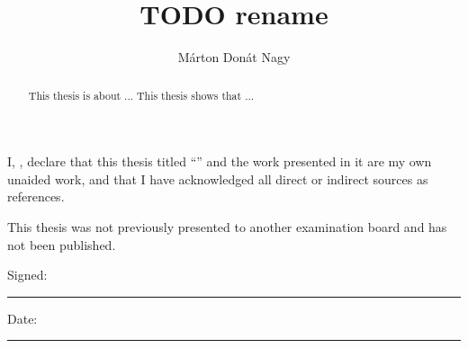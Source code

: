 \documentclass[%
    ]{\PathToTumTemplate/thesis/tum_thesis}
\title{TODO rename}                          %
\author{Márton Donát Nagy}                         %
\begin{document}
\frontmatter

\maketitle

\newcommand{\thecolophon}{  
    \begin{colophon}
        \vspace*{1cm}     
        \begin{minipage}{0.5\textwidth}\begin{flushleft}
        This thesis was typeset using the XeTeX{} 
        typesetting system developed by Jonathan Kew. 
        \end{flushleft}
        \end{minipage}
    \end{colophon}
}


\begin{authordecl}
    \noindent I, \theauthor, declare that this thesis titled
    ``\thetitle'' and the work presented in it are my own unaided
    work, and that I have acknowledged all direct or indirect sources as
    references.

    This thesis was not previously presented to another examination board
    and has not been published.

    \vspace{2em}

    \noindent Signed:\\\vspace{1em}
    \noindent\rule[0.5em]{25em}{0.5pt} %
     
    \noindent Date:\\\vspace{1em}
    \noindent\rule[0.5em]{25em}{0.5pt} %
    \rmfamily
\end{authordecl}
\cleardoublepage


\begin{abstract}
    This thesis is about ...
    This thesis shows that ...
\end{abstract}



\setcounter{tocdepth}{1}
\tableofcontents
\end{document}
